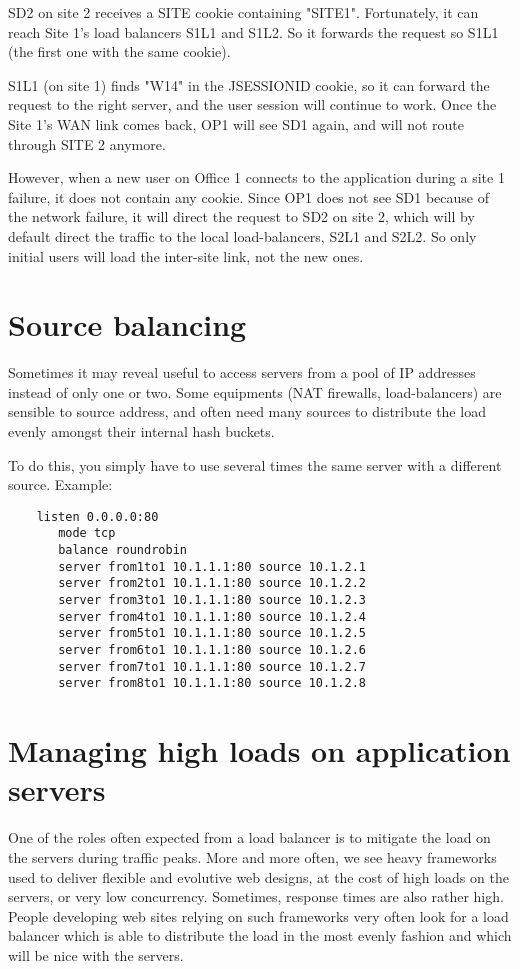 SD2 on site 2 receives a SITE cookie containing "SITE1". Fortunately, it
can reach Site 1's load balancers S1L1 and S1L2. So it forwards the request
so S1L1 (the first one with the same cookie).

S1L1 (on site 1) finds "W14" in the JSESSIONID cookie, so it can forward the
request to the right server, and the user session will continue to work. Once
the Site 1's WAN link comes back, OP1 will see SD1 again, and will not route
through SITE 2 anymore.

However, when a new user on Office 1 connects to the application during a
site 1 failure, it does not contain any cookie. Since OP1 does not see SD1
because of the network failure, it will direct the request to SD2 on site 2,
which will by default direct the traffic to the local load-balancers, S2L1 and
S2L2. So only initial users will load the inter-site link, not the new ones.

\section{Source balancing}

Sometimes it may reveal useful to access servers from a pool of IP addresses
instead of only one or two. Some equipments (NAT firewalls, load-balancers)
are sensible to source address, and often need many sources to distribute the
load evenly amongst their internal hash buckets.

To do this, you simply have to use several times the same server with a
different source. Example:

\begin{verbatim}
    listen 0.0.0.0:80
       mode tcp
       balance roundrobin
       server from1to1 10.1.1.1:80 source 10.1.2.1
       server from2to1 10.1.1.1:80 source 10.1.2.2
       server from3to1 10.1.1.1:80 source 10.1.2.3
       server from4to1 10.1.1.1:80 source 10.1.2.4
       server from5to1 10.1.1.1:80 source 10.1.2.5
       server from6to1 10.1.1.1:80 source 10.1.2.6
       server from7to1 10.1.1.1:80 source 10.1.2.7
       server from8to1 10.1.1.1:80 source 10.1.2.8
\end{verbatim}

\section{Managing high loads on application servers}

One of the roles often expected from a load balancer is to mitigate the load on
the servers during traffic peaks. More and more often, we see heavy frameworks
used to deliver flexible and evolutive web designs, at the cost of high loads
on the servers, or very low concurrency. Sometimes, response times are also
rather high. People developing web sites relying on such frameworks very often
look for a load balancer which is able to distribute the load in the most
evenly fashion and which will be nice with the servers.

